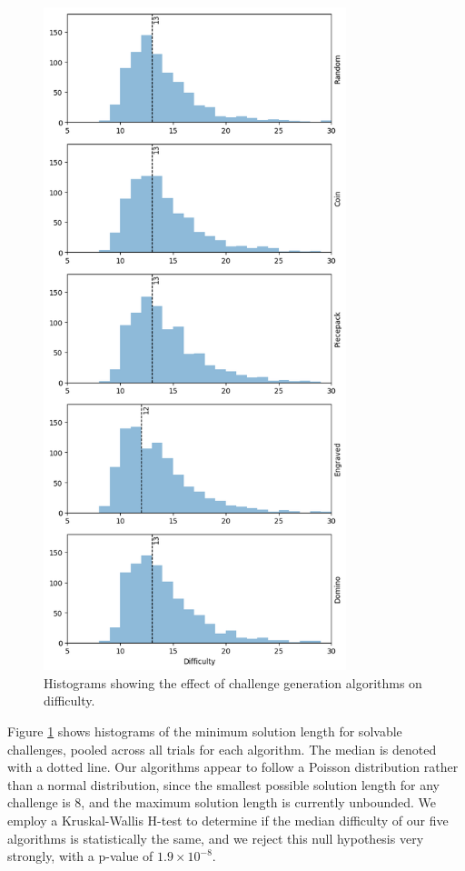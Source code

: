 \documentclass[10pt,journal,compsoc]{IEEEtran}
\begin{document}
\begin{figure}[t]
\centering
\includegraphics[width=8.8cm]{graphics/standalonediff.png}
\caption{Histograms showing the effect of challenge generation algorithms on difficulty.}
\label{fig:difficultycomp}
\end{figure}

Figure \ref{fig:difficultycomp} shows histograms of the minimum solution length for solvable challenges, pooled across all trials for each algorithm. The median is denoted with a dotted line. Our algorithms appear to follow a Poisson distribution rather than a normal distribution, since the smallest possible solution length for any challenge is 8, and the maximum solution length is currently unbounded. We employ a Kruskal-Wallis H-test \cite{KRUSKAL} to determine if the median difficulty of our five algorithms is statistically the same, and we reject this null hypothesis very strongly, with a p-value of $1.9 \times 10^{-8}$.
\end{document}
